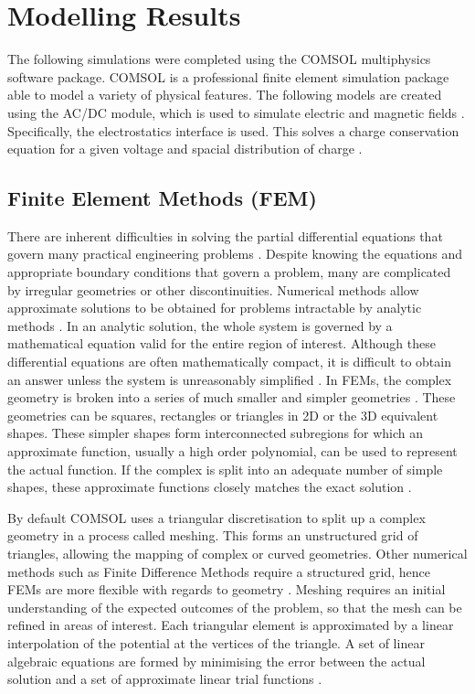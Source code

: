 
\section{Modelling Results}
The following simulations were completed using the COMSOL multiphysics software package.
COMSOL is a professional finite element simulation package able to model a variety of physical features.
The following models are created using the AC/DC module, which is used to simulate electric and magnetic fields \cite{ComsolACDC}.
Specifically, the electrostatics interface is used. 
This solves a charge conservation equation for a given voltage and spacial distribution of charge \cite{ComsolACDC}.

\subsection{Finite Element Methods (FEM)}
There are inherent difficulties in solving the partial differential equations that govern many practical engineering problems \cite{kuffel2000high}.
Despite knowing the equations and appropriate boundary conditions that govern a problem, many are complicated by irregular geometries or other discontinuities.
Numerical methods allow approximate solutions to be obtained for problems intractable by analytic methods \cite{meshkatoddini2006study}.
In an analytic solution, the whole system is governed by a mathematical equation valid for the entire region of interest. 
Although these differential equations are often mathematically compact, it is difficult to obtain an answer unless the system is unreasonably simplified \cite{meshkatoddini2006study}.
In FEMs, the complex geometry is broken into a series of much smaller and simpler geometries \cite{kuffel2000high}.
These geometries can be squares, rectangles or triangles in 2D or the 3D equivalent shapes. 
These simpler shapes form interconnected subregions for which an approximate function, usually a high order polynomial, can be used to represent the actual function.
If the complex is split into an adequate number of simple shapes, these approximate functions closely matches the exact solution \cite{meshkatoddini2006study}.

By default COMSOL uses a triangular discretisation to split up a complex geometry in a process called meshing.
This forms an unstructured grid of triangles, allowing the mapping of complex or curved geometries.
Other numerical methods such as Finite Difference Methods require a structured grid, hence FEMs are more flexible with regards to geometry \cite{kuffel2000high}.
Meshing requires an initial understanding of the expected outcomes of the problem, so that the mesh can be refined in areas of interest.
Each triangular element is approximated by a linear interpolation of the potential at the vertices of the triangle.
A set of linear algebraic equations are formed by minimising the error between the actual solution and a set of approximate linear trial functions \cite{meshkatoddini2006study}.

